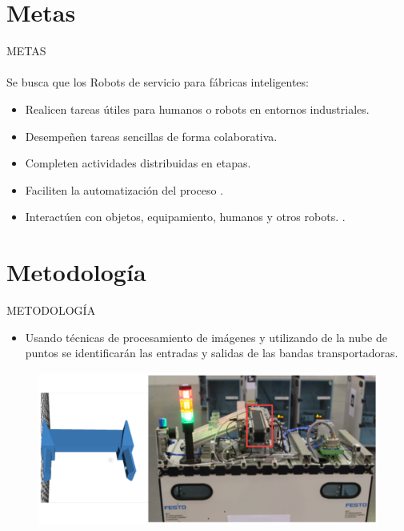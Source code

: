 \documentclass[handout,t]{beamer}
\begin{document}
\section{Metas}
\begin{frame}{METAS}
\phantom{sd}\\
\phantom{sd}\\
Se busca que los Robots de servicio para fábricas inteligentes: 
\begin{itemize}
    \item Realicen tareas útiles para humanos o robots en entornos industriales.
    \item Desempeñen tareas sencillas de forma colaborativa.
    \item Completen actividades distribuidas en etapas.
    \item Faciliten la automatización del proceso \cite{ifr_international_nodate}.
    \item Interactúen con objetos, equipamiento, humanos y otros robots. \cite{basco_industria_2018}.    
\end{itemize}
\end{frame}


\section{Metodología}
\begin{frame}{METODOLOGÍA}
    \begin{itemize}
    \item Usando técnicas de procesamiento de imágenes y utilizando de la nube de puntos se identificarán las entradas y salidas de las bandas transportadoras.
    \end{itemize}
 \begin{figure}[htp]
    \centering
    \includegraphics[scale=0.25]{NewFigures/Conveyor_Belt.png}
\end{figure}  
\end{frame}
\end{document}
